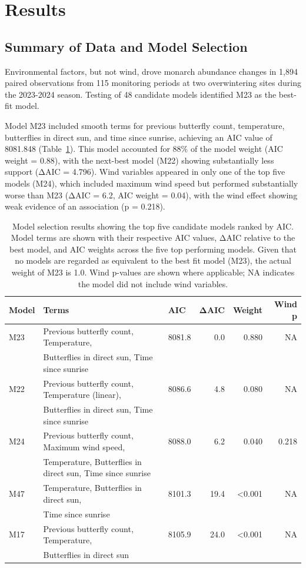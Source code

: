 \section{Results}

\subsection{Summary of Data and Model Selection}

Environmental factors, but not wind, drove monarch abundance changes in 1,894 paired observations from 115 monitoring periods at two overwintering sites during the 2023-2024 season. Testing of 48 candidate models identified M23 as the best-fit model.

Model M23 included smooth terms for previous butterfly count, temperature, butterflies in direct sun, and time since sunrise, achieving an AIC value of 8081.848 (Table~\ref{tab:model_selection}). This model accounted for 88\% of the model weight (AIC weight = 0.88), with the next-best model (M22) showing substantially less support (ΔAIC = 4.796). Wind variables appeared in only one of the top five models (M24), which included maximum wind speed but performed substantially worse than M23 (ΔAIC = 6.2, AIC weight = 0.04), with the wind effect showing weak evidence of an association (p = 0.218).

\begin{table}[htbp]
\centering
\caption{Model selection results showing the top five candidate models ranked by AIC. Model terms are shown with their respective AIC values, ΔAIC relative to the best model, and AIC weights across the five top performing models. Given that no models are regarded as equivalent to the best fit model (M23), the actual weight of M23 is 1.0. Wind p-values are shown where applicable; NA indicates the model did not include wind variables.}
\label{tab:model_selection}
\begin{tabular}{lllrrr}
\hline
Model & Terms & AIC & ΔAIC & Weight & Wind p \\
\hline
M23 & Previous butterfly count, Temperature, & 8081.8 & 0.0 & 0.880 & NA \\
    & Butterflies in direct sun, Time since sunrise & & & & \\
M22 & Previous butterfly count, Temperature (linear), & 8086.6 & 4.8 & 0.080 & NA \\
    & Butterflies in direct sun, Time since sunrise & & & & \\
M24 & Previous butterfly count, Maximum wind speed, & 8088.0 & 6.2 & 0.040 & 0.218 \\
    & Temperature, Butterflies in direct sun, Time since sunrise & & & & \\
M47 & Temperature, Butterflies in direct sun, & 8101.3 & 19.4 & <0.001 & NA \\
    & Time since sunrise & & & & \\
M17 & Previous butterfly count, Temperature, & 8105.9 & 24.0 & <0.001 & NA \\
    & Butterflies in direct sun & & & & \\
\hline
\end{tabular}
\end{table}

